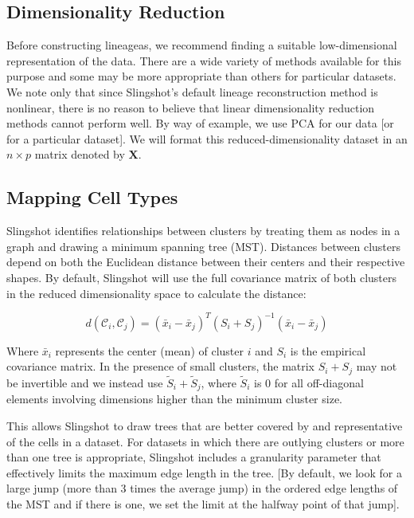 \documentclass[11pt]{article}\usepackage[]{graphicx}\usepackage[]{color}
\begin{document}
\subsection{Dimensionality Reduction}
Before constructing lineageas, we recommend finding a suitable low-dimensional representation of the data. There are a wide variety of methods available for this purpose and some may be more appropriate than others for particular datasets. We note only that since Slingshot's default lineage reconstruction method is nonlinear, there is no reason to believe that linear dimensionality reduction methods cannot perform well. By way of example, we use PCA for our data [or for a particular dataset]. We will format this reduced-dimensionality dataset in an $n \times p$ matrix denoted by $\mathbf{X}$.

\subsection{Mapping Cell Types}
Slingshot identifies relationships between clusters by treating them as nodes in a graph and drawing a minimum spanning tree (MST). Distances between clusters depend on both the Euclidean distance between their centers and their respective shapes. By default, Slingshot will use the full covariance matrix of both clusters in the reduced dimensionality space to calculate the distance:

$$d(\mathcal{C}_i,\mathcal{C}_j) = (\bar{x}_i - \bar{x}_j)^T (S_i + S_j)^{-1} (\bar{x}_i - \bar{x}_j)$$

Where $\bar{x}_i$ represents the center (mean) of cluster $i$ and $S_i$ is the empirical covariance matrix. In the presence of small clusters, the matrix $S_i + S_j$ may not be invertible and we instead use $\tilde{S}_i + \tilde{S}_j$, where $\tilde{S}_i$ is $0$ for all off-diagonal elements involving dimensions higher than the minimum cluster size.

This allows Slingshot to draw trees that are better covered by and representative of the cells in a dataset. For datasets in which there are outlying clusters or more than one tree is appropriate, Slingshot includes a granularity parameter that effectively limits the maximum edge length in the tree. [By default, we look for a large jump (more than 3 times the average jump) in the ordered edge lengths of the MST and if there is one, we set the limit at the halfway point of that jump]. 
\end{document}

